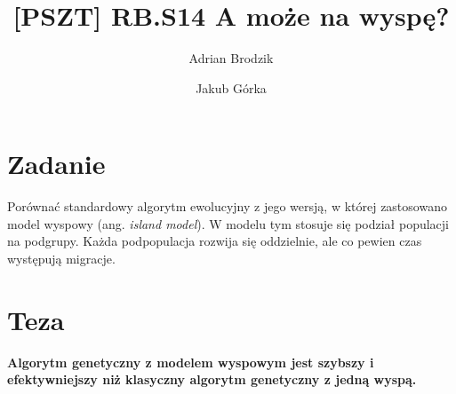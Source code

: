 \documentclass[12pt,a4paper]{article}
\begin{document}
\title{[PSZT] RB.S14 A może na wyspę?}
\author{Adrian Brodzik \and Jakub Górka}
\maketitle

\section*{Zadanie}
Porównać standardowy algorytm ewolucyjny z jego wersją, w której zastosowano model wyspowy (ang. \textit{island model}). W modelu tym stosuje się podział populacji na podgrupy. Każda podpopulacja rozwija się oddzielnie, ale co pewien czas występują migracje.

\section*{Teza}
\textbf{Algorytm genetyczny z modelem wyspowym jest szybszy i efektywniejszy niż klasyczny algorytm genetyczny z jedną wyspą.}
\end{document}
